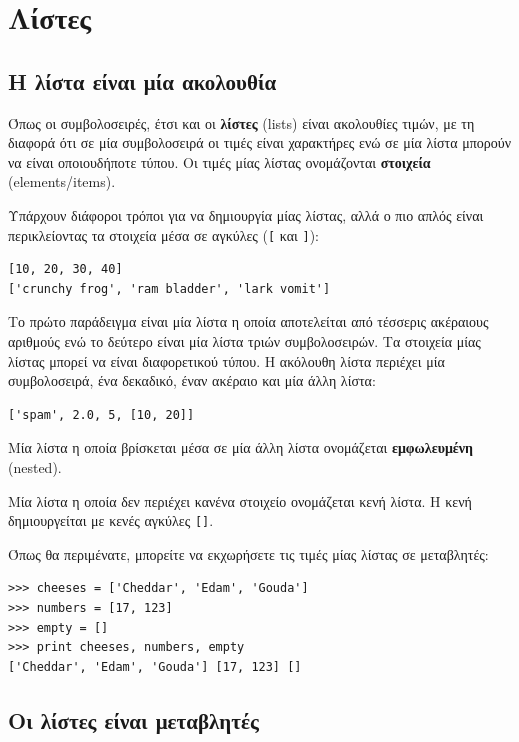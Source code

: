 \documentclass[10pt]{book}
\begin{document}
\chapter{Λίστες}

\section{Η λίστα είναι μία ακολουθία}
\label{sequence}

Όπως οι συμβολοσειρές, έτσι και οι {\bf λίστες} (lists) είναι ακολουθίες τιμών, με τη διαφορά ότι σε μία συμβολοσειρά οι τιμές είναι χαρακτήρες ενώ σε μία λίστα μπορούν να είναι οποιουδήποτε τύπου. Οι τιμές μίας λίστας ονομάζονται {\bf στοιχεία} (elements/items).

Υπάρχουν διάφοροι τρόποι για να δημιουργία μίας λίστας, αλλά ο πιο απλός είναι 
περικλείοντας τα στοιχεία μέσα σε αγκύλες (\verb"[" και \verb"]"):

\begin{verbatim}
[10, 20, 30, 40]
['crunchy frog', 'ram bladder', 'lark vomit']
\end{verbatim}
%

Το πρώτο παράδειγμα είναι μία λίστα η οποία αποτελείται από τέσσερις ακέραιους αριθμούς ενώ το δεύτερο είναι μία λίστα τριών συμβολοσειρών. Τα στοιχεία μίας λίστας μπορεί να είναι διαφορετικού τύπου. Η ακόλουθη λίστα περιέχει μία συμβολοσειρά, ένα δεκαδικό, έναν ακέραιο και μία άλλη λίστα:

\begin{verbatim}
['spam', 2.0, 5, [10, 20]]
\end{verbatim}
%

Μία λίστα η οποία βρίσκεται μέσα σε μία άλλη λίστα ονομάζεται {\bf εμφωλευμένη} (nested).

Μία λίστα η οποία δεν περιέχει κανένα στοιχείο ονομάζεται κενή λίστα. Η κενή
δημιουργείται με κενές αγκύλες \verb"[]".

Όπως θα περιμένατε, μπορείτε να εκχωρήσετε τις τιμές μίας λίστας σε μεταβλητές:

\begin{verbatim}
>>> cheeses = ['Cheddar', 'Edam', 'Gouda']
>>> numbers = [17, 123]
>>> empty = []
>>> print cheeses, numbers, empty
['Cheddar', 'Edam', 'Gouda'] [17, 123] []
\end{verbatim}
%


\section{Οι λίστες είναι μεταβλητές}
\label{mutable}
\end{document}
